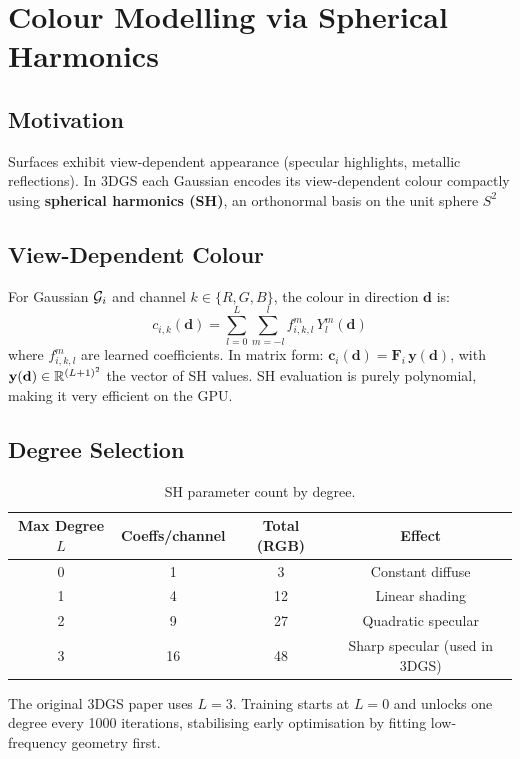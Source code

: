 \section{Colour Modelling via Spherical Harmonics}
\label{sec:sh}

\subsection{Motivation}

Surfaces exhibit view-dependent appearance (specular highlights, metallic
reflections). In 3DGS each Gaussian encodes its view-dependent colour compactly
using \textbf{spherical harmonics (SH)}, an orthonormal basis on the unit
sphere $S^2$

\subsection{View-Dependent Colour}

For Gaussian $\mathcal{G}_i$ and channel $k \in \{R,G,B\}$, the colour in direction
$\mathbf{d}$ is:
\begin{equation}
  \boxed{
    c_{i,k}(\mathbf{d}) = \sum_{l=0}^{L} \sum_{m=-l}^{l}
      f_{i,k,l}^m\, Y_l^m(\mathbf{d})
  }
  \label{eq:sh_color}
\end{equation}
where $f_{i,k,l}^m$ are learned coefficients. In matrix form:
$\mathbf{c}_i(\mathbf{d}) = \mathbf{F}_i\,\mathbf{y}(\mathbf{d})$,
with $\mathbf{y}(\mathbf{d}) \in \mathbb{R}^{(L+1)^2}$ the vector of SH values.
SH evaluation is purely polynomial, making it very efficient on the GPU.

\subsection{Degree Selection}

\begin{table}[H]
  \centering
  \caption{SH parameter count by degree.}
  \label{tab:sh_count}
  \renewcommand{\arraystretch}{1.3}
  \begin{tabular}{cccc}
    \toprule
    \textbf{Max Degree $L$} & \textbf{Coeffs/channel} & \textbf{Total (RGB)} & \textbf{Effect} \\
    \midrule
    0 & 1  & 3  & Constant diffuse \\
    1 & 4  & 12 & Linear shading \\
    2 & 9  & 27 & Quadratic specular \\
    3 & 16 & 48 & Sharp specular (used in 3DGS) \\
    \bottomrule
  \end{tabular}
\end{table}

The original 3DGS paper uses $L=3$. Training starts at $L=0$ and unlocks one
degree every 1000 iterations, stabilising early optimisation by fitting
low-frequency geometry first.

\newpage
